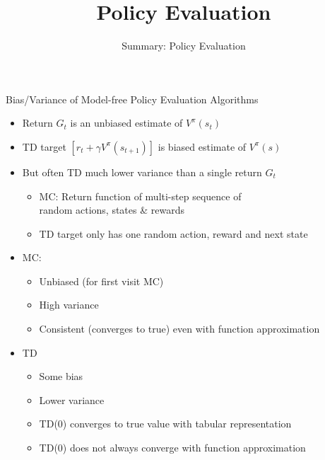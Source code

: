 \documentclass[aspectratio=169]{../latex_main/tntbeamer}  %
\title[Reinforcement Learning: Policy Evaluation]{Policy Evaluation}
\subtitle{Summary: Policy Evaluation}
\begin{document}
	
	\maketitle

\begin{frame}[c]{Bias/Variance of Model-free Policy Evaluation Algorithms}

\begin{itemize}
	\item Return $G_t$ is an unbiased estimate of $V^\pi(s_t)$
	\item TD target $[r_t + \gamma V^\pi(s_{t+1})]$ is biased estimate of $V^\pi(s)$ 
	\item But often TD much lower variance than a single return $G_t$
	\begin{itemize}
		\item MC: Return function of multi-step sequence of \\ random actions, states \& rewards
		\item TD target only has one random action, reward and next state
	\end{itemize}
	\pause
	\item MC:
	\begin{itemize}
		\item Unbiased (for first visit MC)
		\item High variance
		\item Consistent (converges to true) even with function approximation
	\end{itemize}
	\pause
	\item TD
	\begin{itemize}
		\item Some bias
		\item Lower variance
		\item TD(0) converges to true value with tabular representation
		\item TD(0) does not always converge with function approximation
	\end{itemize}
\end{itemize}
	
\end{frame}
\end{document}
